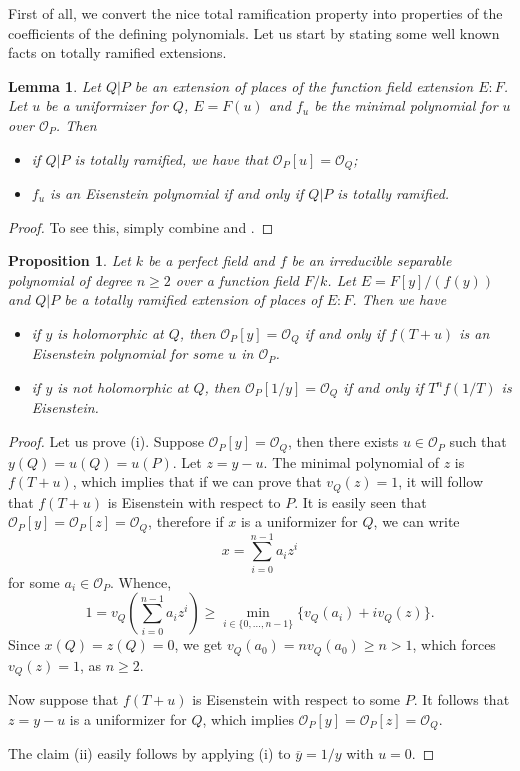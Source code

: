 \documentclass[10pt]{amsart}
\newcommand{\cO}{\mathcal{O}}
\newtheorem{lemma}[theorem]{Lemma}
\newtheorem{proposition}[theorem]{Proposition}
\theoremstyle{definition}
\theoremstyle{remark}
\numberwithin{equation}{section}
\begin{document}
First of all, we convert the nice total ramification property into properties of the coefficients of the  defining polynomials. 
Let us start by stating some well known facts on totally ramified extensions.
\begin{lemma}\label{propcombinationstich}
Let $Q|P$ be an extension of places of the function field extension $E:F$. Let $u$ be a uniformizer for $Q$, $E=F(u)$ and $f_u$ be the minimal polynomial for $u$ over $\cO_P$. 
Then
\begin{itemize}
\item if $Q|P$ is totally ramified, we have that $\cO_P[u]=\cO_Q$;
\item $f_u$ is an Eisenstein polynomial if and only if $Q|P$ is totally ramified.
\end{itemize}
\end{lemma}
\begin{proof}
To see this, simply combine \cite[Proposition 3.1.15]{bib:stichtenoth2009algebraic} and \cite[Proposition 3.5.12]{bib:stichtenoth2009algebraic}.
\end{proof}
\begin{proposition}\label{fund_thm_ramified}
Let $k$ be a perfect field and $f$ be an irreducible separable polynomial of degree $n\geq 2$ over a function field $F/k$. Let $E=F[y]/(f(y))$ and $Q|P$ be a totally ramified extension of places of $E:F$. 
Then we have
\begin{itemize}
\item[(i)] if $y$ is holomorphic at $Q$, then $\cO_P[y]=\cO_Q$ if and only if $f(T+u)$ is an Eisenstein polynomial for some $u$ in $\cO_P$.
\item[(ii)] if $y$ is not holomorphic at $Q$, then $\cO_P[1/y]=\cO_Q$ if and only if $T^nf(1/T)$ is Eisenstein.
\end{itemize}
\end{proposition}
\begin{proof}
Let us prove (i). Suppose $\cO_P[y]=\cO_Q$, then there exists $u\in \cO_P$ such that $y(Q)=u(Q)=u(P)$. Let $z=y-u$.
The minimal polynomial of $z$ is $f(T+u)$, which implies that if we can prove that $v_Q(z)=1$, it will follow that $f(T+u)$ is Eisenstein with respect to $P$.
It is easily seen that $\cO_P[y]=\cO_P[z]=\cO_Q$, therefore if $x$ is a uniformizer for $Q$, we can write
\[x=\sum^{n-1}_{i=0}a_i z^i\]
for some $a_i\in \cO_P$. Whence,
\[1=v_Q\left(\sum^{n-1}_{i=0}a_i z^i\right)\geq \min_{i\in \{0,\dots,n-1\}}\{v_Q(a_i)+iv_Q(z)\}.\]
Since $x(Q)=z(Q)=0$, we get $v_Q(a_0)=nv_Q(a_0)\geq n>1$, which forces $v_Q(z)=1$, as $n\geq 2$.

Now suppose that $f(T+u)$ is Eisenstein with respect to some $P$. It follows that $z=y-u$ is a uniformizer for $Q$, which implies $\cO_P[y]=\cO_P[z]=\cO_Q$.

The claim (ii) easily follows by applying (i) to $\overline y=1/y$ with $u=0$.
\end{proof}
\end{document}
